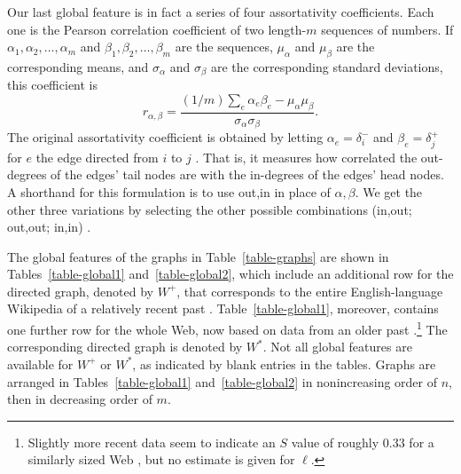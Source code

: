 \documentclass{article}
\begin{document}
Our last global feature is in fact a series of four assortativity coefficients.
Each one is the Pearson correlation coefficient of two length-$m$ sequences of
numbers. If $\alpha_1,\alpha_2,\ldots,\alpha_m$ and
$\beta_1,\beta_2,\ldots,\beta_m$ are the sequences, $\mu_\alpha$ and $\mu_\beta$
are the corresponding means, and $\sigma_\alpha$ and $\sigma_\beta$ are the
corresponding standard deviations, this coefficient is
\begin{equation}
r_{\alpha,\beta}=\frac
{(1/m)\sum_e\alpha_e\beta_e-\mu_\alpha\mu_\beta}
{\sigma_\alpha\sigma_\beta}.
\end{equation}
The original assortativity coefficient is obtained by letting
$\alpha_e=\delta_i^-$ and $\beta_e=\delta_j^+$ for $e$ the edge directed from
$i$ to $j$ \cite{n02,n03}. That is, it measures how correlated the out-degrees
of the edges' tail nodes are with the in-degrees of the edges' head nodes. A
shorthand for this formulation is to use out,in in place of $\alpha,\beta$. We
get the other three variations by selecting the other possible combinations
(in,out; out,out; in,in) \cite{ffgp10,ppz11}.

The global features of the graphs in Table~\ref{table-graphs} are shown in
Tables~\ref{table-global1} and~\ref{table-global2}, which include an additional
row for the directed graph, denoted by $W^+$, that corresponds to the entire
English-language Wikipedia of a relatively recent past \cite{cscbdlc06,zbsd06}.
Table~\ref{table-global1}, moreover, contains one further row for the whole
Web, now based on data from an older past \cite{bkmrrstw00}.\footnote{Slightly
more recent data seem to indicate an $S$ value of roughly $0.33$ for a similarly
sized Web \cite{dllm04}, but no estimate is given for $\ell$.} The corresponding
directed graph is denoted by $W^*$. Not all global features are available for
$W^+$ or $W^*$, as indicated by blank entries in the tables. Graphs are arranged
in Tables~\ref{table-global1} and~\ref{table-global2} in nonincreasing order of
$n$, then in decreasing order of $m$.

\begin{table}
\centering
\caption{Global features: mean in- or out-degree ($\delta^+$), mean degree
($\delta$) and the resulting value of $2\delta^+/\delta-1$, fraction of $n$
within the GSCC ($S$), average distance between distinct nodes ($\ell$), and
clustering coefficient ($C$, along with the value, $C'$, it would have if
connections were random).}
\label{table-global1}

\end{table}
\end{document}
